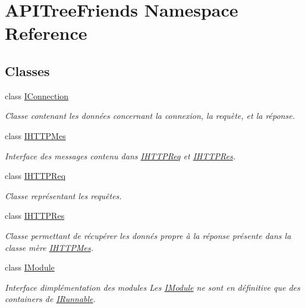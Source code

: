 \hypertarget{namespace_a_p_i_tree_friends}{}\section{A\+P\+I\+Tree\+Friends Namespace Reference}
\label{namespace_a_p_i_tree_friends}
\subsection*{Classes}
\begin{DoxyCompactItemize}
\item 
class \hyperlink{class_a_p_i_tree_friends_1_1_i_connection}{I\+Connection}
\begin{DoxyCompactList}\small\item\em Classe contenant les données concernant la connexion, la requète, et la réponse. \end{DoxyCompactList}\item 
class \hyperlink{class_a_p_i_tree_friends_1_1_i_h_t_t_p_mes}{I\+H\+T\+T\+P\+Mes}
\begin{DoxyCompactList}\small\item\em Interface des messages contenu dans \hyperlink{class_a_p_i_tree_friends_1_1_i_h_t_t_p_req}{I\+H\+T\+T\+P\+Req} et \hyperlink{class_a_p_i_tree_friends_1_1_i_h_t_t_p_res}{I\+H\+T\+T\+P\+Res}. \end{DoxyCompactList}\item 
class \hyperlink{class_a_p_i_tree_friends_1_1_i_h_t_t_p_req}{I\+H\+T\+T\+P\+Req}
\begin{DoxyCompactList}\small\item\em Classe représentant les requêtes. \end{DoxyCompactList}\item 
class \hyperlink{class_a_p_i_tree_friends_1_1_i_h_t_t_p_res}{I\+H\+T\+T\+P\+Res}
\begin{DoxyCompactList}\small\item\em Classe permettant de récupérer les donnés propre à la réponse présente dans la classe mère \hyperlink{class_a_p_i_tree_friends_1_1_i_h_t_t_p_mes}{I\+H\+T\+T\+P\+Mes}. \end{DoxyCompactList}\item 
class \hyperlink{class_a_p_i_tree_friends_1_1_i_module}{I\+Module}
\begin{DoxyCompactList}\small\item\em Interface d\textquotesingle{}implémentation des modules Les \hyperlink{class_a_p_i_tree_friends_1_1_i_module}{I\+Module} ne sont en définitive que des containers de \hyperlink{class_a_p_i_tree_friends_1_1_i_runnable}{I\+Runnable}. \end{DoxyCompactList}\item 

\end{DoxyCompactItemize}
